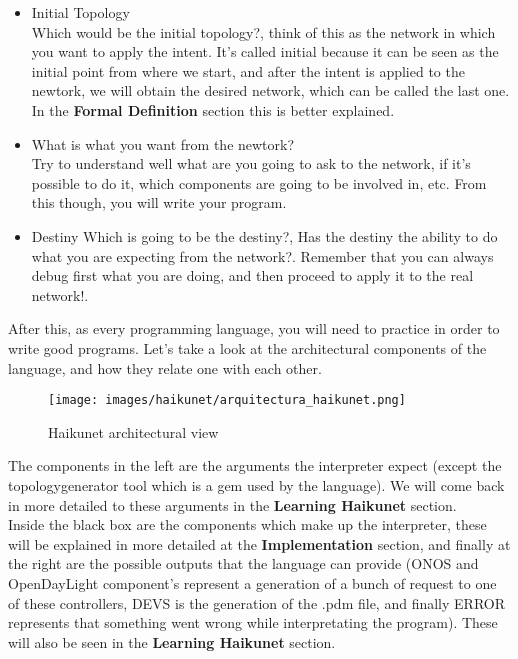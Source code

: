\begin{itemize}
\item Initial Topology\\
Which would be the initial topology?, think of this as the network in which you want to apply the intent. It's called initial because it can be seen as the initial point from where we start, and after the intent is applied to the newtork, we will obtain the desired network, which can be called the last one. In the \textbf{Formal Definition} section this is better explained.
\item What is what you want from the newtork?\\
Try to understand well what are you going to ask to the network, if it's possible to do it, which components are going to be involved in, etc. From this though, you will write your program.
\item Destiny
Which is going to be the destiny?, Has the destiny the ability to do what you are expecting from the network?. Remember that you can always debug first what you are doing, and then proceed to apply it to the real network!.
\end{itemize}

After this, as every programming language, you will need to practice in order to write good programs. Let's take a look at the architectural components of the language, and how they relate one with each other.

\begin{figure}[H]
\centering
\texttt{[image: images/haikunet/arquitectura\_haikunet.png]}
\caption{Haikunet architectural view}
\end{figure}

The components in the left are the arguments the interpreter expect (except the topologygenerator tool which is a gem used by the language). We will come back in more detailed to these arguments in the \textbf{Learning Haikunet} section.\\
Inside the black box are the components which make up the interpreter, these will be explained in more detailed at the \textbf{Implementation} section, and finally at the right are the possible outputs that the language can provide (ONOS and OpenDayLight component's represent a generation of a bunch of request to one of these controllers, DEVS is the generation of the .pdm file, and finally ERROR represents that something went wrong while interpretating the program). These will also be seen in the \textbf{Learning Haikunet} section.\\

